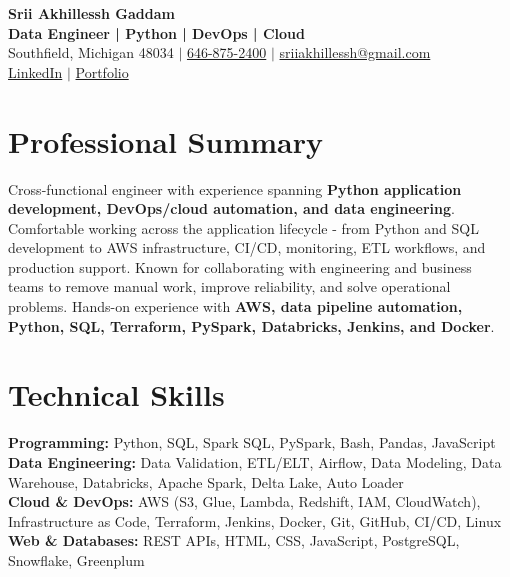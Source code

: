 \documentclass[letterpaper,10pt]{article}
\begin{document}
\fontsize{9.35pt}{10.45pt}\selectfont

\begin{center}
    {\LARGE \textbf{Srii Akhillessh Gaddam}} \\[-1pt]
    \textbf{Data Engineer | Python | DevOps | Cloud} \\[2pt]
    Southfield, Michigan 48034 $|$
    \href{tel:6468752400}{646-875-2400} $|$
    \href{mailto:sriiakhillessh@gmail.com}{sriiakhillessh@gmail.com} \\[1pt]
    \href{https://www.linkedin.com/in/srii-akhiilessh-gaddam-b48668191/}{LinkedIn} $|$
    \href{https://sriiakhillesshg.github.io/portfolio/}{Portfolio}
\end{center}
\vspace{-8pt}

\section{Professional Summary}
\small{Cross-functional engineer with experience spanning \textbf{Python application development, DevOps/cloud automation, and data engineering}. Comfortable working across the application lifecycle - from Python and SQL development to AWS infrastructure, CI/CD, monitoring, ETL workflows, and production support. Known for collaborating with engineering and business teams to remove manual work, improve reliability, and solve operational problems. Hands-on experience with \textbf{AWS, data pipeline automation, Python, SQL, Terraform, PySpark, Databricks, Jenkins, and Docker}.}

\section{Technical Skills}
\small{
\textbf{Programming:} Python, SQL, Spark SQL, PySpark, Bash, Pandas, JavaScript \\
\textbf{Data Engineering:} Data Validation, ETL/ELT, Airflow, Data Modeling, Data Warehouse, Databricks, Apache Spark, Delta Lake, Auto Loader \\
\textbf{Cloud \& DevOps:} AWS (S3, Glue, Lambda, Redshift, IAM, CloudWatch), Infrastructure as Code, Terraform, Jenkins, Docker, Git, GitHub, CI/CD, Linux \\
\textbf{Web \& Databases:} REST APIs, HTML, CSS, JavaScript, PostgreSQL, Snowflake, Greenplum
}
\end{document}
